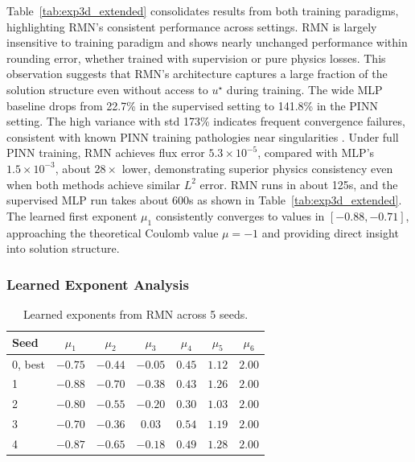 \documentclass[twoside,11pt]{article}
\begin{document}
Table~\ref{tab:exp3d_extended} consolidates results from both training paradigms, highlighting RMN's consistent performance across settings. RMN is largely insensitive to training paradigm and shows nearly unchanged performance within rounding error, whether trained with supervision or pure physics losses. This observation suggests that RMN's architecture captures a large fraction of the solution structure even without access to $u^\star$ during training. The wide MLP baseline drops from 22.7\% in the supervised setting to 141.8\% in the PINN setting. The high variance with std 173\% indicates frequent convergence failures, consistent with known PINN training pathologies near singularities \citep{wang2021understanding}. Under full PINN training, RMN achieves flux error $5.3 \times 10^{-5}$, compared with MLP's $1.5 \times 10^{-3}$, about $28\times$ lower, demonstrating superior physics consistency even when both methods achieve similar $L^2$ error. RMN runs in about 125s, and the supervised MLP run takes about 600s as shown in Table~\ref{tab:exp3d_extended}. The learned first exponent $\mu_1$ consistently converges to values in $[-0.88, -0.71]$, approaching the theoretical Coulomb value $\mu = -1$ and providing direct insight into solution structure.

\subsubsection{Learned Exponent Analysis}


\begin{table}[t]
	\centering
	\begin{tabular}{lcccccc}
		\toprule
		Seed    & $\mu_1$ & $\mu_2$ & $\mu_3$ & $\mu_4$ & $\mu_5$ & $\mu_6$ \\
		\midrule
		0, best & $-0.75$ & $-0.44$ & $-0.05$ & $0.45$  & $1.12$  & $2.00$  \\
		1       & $-0.88$ & $-0.70$ & $-0.38$ & $0.43$  & $1.26$  & $2.00$  \\
		2       & $-0.80$ & $-0.55$ & $-0.20$ & $0.30$  & $1.03$  & $2.00$  \\
		3       & $-0.70$ & $-0.36$ & $0.03$  & $0.54$  & $1.19$  & $2.00$  \\
		4       & $-0.87$ & $-0.65$ & $-0.18$ & $0.49$  & $1.28$  & $2.00$  \\
		\bottomrule
	\end{tabular}
	\caption{Learned exponents from RMN across 5 seeds.}
	\label{tab:learned_exponents}

\end{table}
\end{document}
